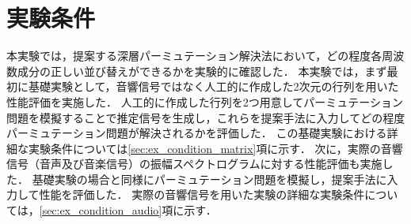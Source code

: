 \section{実験条件}
\label{sec:ex_condition}
本実験では，提案する深層パーミュテーション解決法において，どの程度各周波数成分の正しい並び替えができるかを実験的に確認した．
本実験では，まず最初に基礎実験として，音響信号ではなく人工的に作成した2次元の行列を用いた性能評価を実施した．
人工的に作成した行列を2つ用意してパーミュテーション問題を模擬することで推定信号を生成し，これらを提案手法に入力してどの程度パーミュテーション問題が解決されるかを評価した．
この基礎実験における詳細な実験条件については\ref{sec:ex_condition_matrix}項に示す．
次に，実際の音響信号（音声及び音楽信号）の振幅スペクトログラムに対する性能評価も実施した．
基礎実験の場合と同様にパーミュテーション問題を模擬し，提案手法に入力して性能を評価した．
実際の音響信号を用いた実験の詳細な実験条件については，\ref{sec:ex_condition_audio}項に示す．
